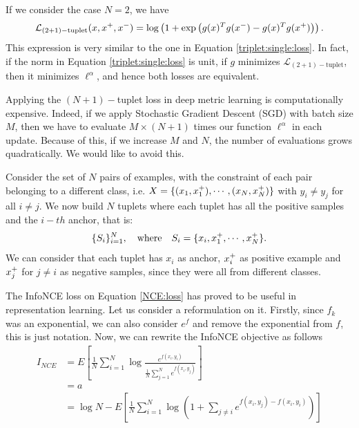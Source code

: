 \begin{remark}
If we consider the case $N=2$, we have
\[
\mathcal L_{(2+1)-\text{tuplet}}(x,x^+,x^-) = \log \left( 1+ \exp \left(g(x)^Tg(x^-) - g(x)^T g(x^+)\right)\right).
\]
This expression is very similar to the one in Equation \eqref{triplet:single:loss}. In fact, if the norm in Equation \eqref{triplet:single:loss} is unit, if $g$ minimizes $\mathcal L_{(2+1)-\text{tuplet}}$, then it minimizes $\ell^\alpha$, and hence both losses are equivalent.
\end{remark}

Applying the $(N+1)-$tuplet loss in deep metric learning is computationally expensive. Indeed, if we apply Stochastic Gradient Descent (SGD) with batch size $M$, then we have to evaluate $M \times (N+1)$ times our function $\ell^\alpha$ in each update. Because of this, if we increase $M$ and $N$, the number of evaluations grows quadratically. We would like to avoid this.

Consider the set of $N$ pairs of examples, with the constraint of each pair belonging to a different class, i.e. $X = \{(x_1,x^+_1),\cdots,(x_N,x^+_N)\}$ with $y_i \neq y_j$ for all $i \neq j$. We now build $N$ tuplets where each tuplet has all the positive samples and the $i-th$ anchor, that is:
\[
\{S_i\}_{i=1}^N, \quad \text{where} \quad S_i = \{x_i, x^+_1,\cdots,x^+_N\}.  
\]
We can consider that each tuplet has $x_i$ as anchor, $x^+_i$ as positive example and $x^+_j$ for $j \neq i$ as negative samples, since they were all from different classes.



The InfoNCE loss on Equation \eqref{NCE:loss} has proved to be useful in representation learning. Let us consider a reformulation on it. Firstly, since $f_k$ was an exponential, we can also consider $e^f$ and remove the exponential from $f$, this is just notation. Now, we can rewrite the InfoNCE objective as follows
\begin{align*}
I_{NCE}  & = E\left[ \frac{1}{N} \sum_{i = 1}^N \log \frac{e^{f(x_i,y_i)}}{\frac{1}{N}\sum_{j=1}^N e^{f(x_i,y_j)}}\right]\\
& = a\\
& = \log N - E\left[ \frac{1}{N} \sum_{i=1}^N \log \left( 1+ \sum_{j\neq i}e^{f(x_i,y_j)- f(x_i,y_i)}\right)\right]
\end{align*}

